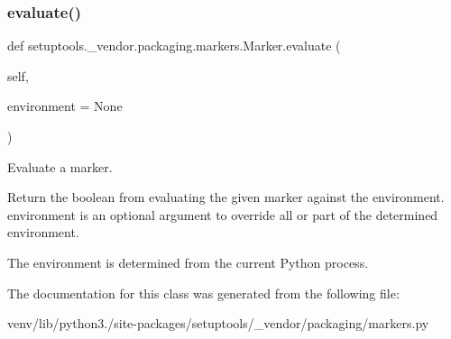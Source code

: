 \subsubsection{\texorpdfstring{evaluate()}{evaluate()}}
{\footnotesize\ttfamily def setuptools.\+\_\+vendor.\+packaging.\+markers.\+Marker.\+evaluate (\begin{DoxyParamCaption}\item[{}]{self,  }\item[{}]{environment = {\ttfamily None} }\end{DoxyParamCaption})}

\begin{DoxyVerb}Evaluate a marker.

Return the boolean from evaluating the given marker against the
environment. environment is an optional argument to override all or
part of the determined environment.

The environment is determined from the current Python process.
\end{DoxyVerb}
 

The documentation for this class was generated from the following file\+:\begin{DoxyCompactItemize}
\item 
venv/lib/python3./site-\/packages/setuptools/\+\_\+vendor/packaging/markers.\+py\end{DoxyCompactItemize}
